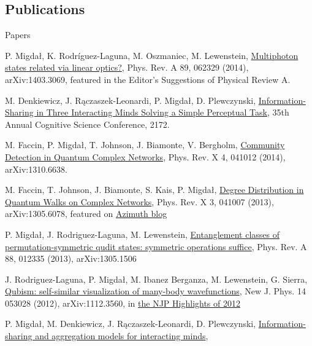 \documentclass[margin,line]{resume}
\begin{document}
\begin{resume}
    \section{\mysidestyle Publications}
    Papers
    \begin{list2}
        \item P. Migdał, K. Rodríguez-Laguna, M. Oszmaniec, M. Lewenstein,
        \href{http://arxiv.org/abs/1403.3069}{Multiphoton states related via linear optics?}, Phys. Rev. A 89, 062329 (2014), arXiv:1403.3069,
        featured in the Editor's Suggestions of Physical Review A.
        \item M. Denkiewicz, J. Rączaszek-Leonardi, P. Migdał, D. Plewczynski,
        \href{https://mindmodeling.org/cogsci2013/papers/0398/}{Information-Sharing in Three Interacting Minds Solving a Simple Perceptual Task},
        35th Annual Cognitive Science Conference, 2172.
        \item M. Faccin, P. Migdał, T. Johnson, J. Biamonte, V. Bergholm,
        \href{http://arxiv.org/abs/1310.6638}{Community Detection in Quantum Complex Networks}, Phys. Rev. X 4, 041012 (2014), arXiv:1310.6638.
        \item M. Faccin, T. Johnson, J. Biamonte, S. Kais, P. Migdał,
        \href{http://arxiv.org/abs/1305.6078}{Degree Distribution in Quantum Walks on Complex Networks},
        Phys. Rev. X 3, 041007 (2013),
        arXiv:1305.6078,
        featured on \href{http://johncarlosbaez.wordpress.com/2013/08/05/quantum-network-theory-part-1/}{Azimuth blog}
        \item P. Migdał, J. Rodriguez-Laguna, M. Lewenstein,
        \href{http://arxiv.org/abs/1305.1506}{Entanglement classes of permutation-symmetric qudit states: symmetric operations suffice},
        Phys. Rev. A 88, 012335 (2013), arXiv:1305.1506
        \item J. Rodriguez-Laguna, P. Migdał, M. Ibanez Berganza, M. Lewenstein, G. Sierra, \href{http://dx.doi.org/10.1088/1367-2630/14/5/053028}{Qubism: self-similar visualization of many-body wavefunctions}, New J. Phys. 14 053028 (2012), arXiv:1112.3560,
        in \href{http://iopscience.iop.org/1367-2630/page/Highlights%20of%202012}{the NJP Highlights of 2012}
		\item P. Migdał, M. Denkiewicz, J. Rączaszek-Leonardi, D. Plewczynski, \href{http://arxiv.org/abs/1109.2044}{Information-sharing and aggregation models for interacting minds},

\end{list2}
\end{resume}
\end{document}
